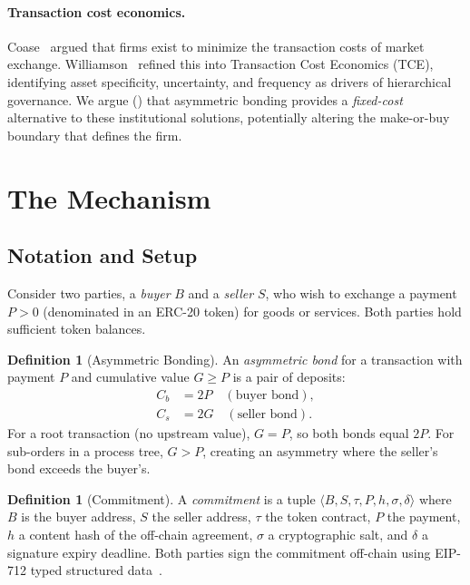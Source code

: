 \documentclass[11pt,a4paper]{article}
\theoremstyle{definition}
\newtheorem{definition}[theorem]{Definition}
\theoremstyle{remark}
\newcommand{\pay}{P}           %
\newcommand{\cumval}{G}        %
\newcommand{\sbond}{C_s}       %
\newcommand{\bbond}{C_b}       %
\begin{document}
\paragraph{Transaction cost economics.}
Coase~\citep{coase1937} argued that firms exist to minimize the
transaction costs of market exchange. Williamson~\citep{williamson1985}
refined this into Transaction Cost Economics (TCE), identifying asset
specificity, uncertainty, and frequency as drivers of hierarchical
governance. We argue () that asymmetric bonding
provides a \emph{fixed-cost} alternative to these institutional
solutions, potentially altering the make-or-buy boundary that defines
the firm.

\section{The Mechanism}
\label{sec:mechanism}

\subsection{Notation and Setup}

Consider two parties, a \emph{buyer} $B$ and a \emph{seller} $S$, who
wish to exchange a payment $\pay > 0$ (denominated in an ERC-20 token)
for goods or services. Both parties hold sufficient token balances.

\begin{definition}[Asymmetric Bonding]
\label{def:asymmetric-bonding}
An \emph{asymmetric bond} for a transaction with payment $\pay$ and
cumulative value $\cumval \geq \pay$ is a pair of deposits:
\begin{align}
  \bbond &= 2\pay \quad (\text{buyer bond}), \label{eq:buyer-bond} \\
  \sbond &= 2\cumval \quad (\text{seller bond}). \label{eq:seller-bond}
\end{align}
For a root transaction (no upstream value), $\cumval = \pay$, so both
bonds equal $2\pay$. For sub-orders in a process tree,
$\cumval > \pay$, creating an asymmetry where the seller's bond exceeds
the buyer's.
\end{definition}

\begin{definition}[Commitment]
\label{def:commitment}
A \emph{commitment} is a tuple $\langle B, S, \tau, \pay, h, \sigma,
\delta \rangle$ where $B$ is the buyer address, $S$ the seller address,
$\tau$ the token contract, $\pay$ the payment, $h$ a content hash of
the off-chain agreement, $\sigma$ a cryptographic salt, and $\delta$ a
signature expiry deadline. Both parties sign the commitment off-chain
using EIP-712 typed structured data~\citep{eip712}.
\end{definition}
\end{document}
